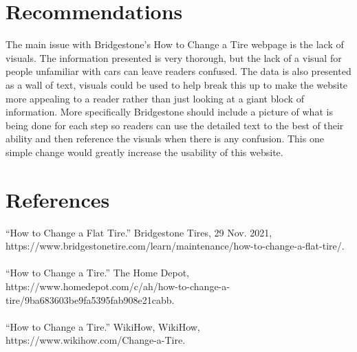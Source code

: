 \documentclass[12pt,A4paper]{article}
\begin{document}
	\section{Recommendations}
	The main issue with Bridgestone’s How to Change a Tire webpage is the lack of visuals. The information presented is very thorough, but the lack of a visual for people unfamiliar with cars can leave readers confused. The data is also presented as a wall of text, visuals could be used to help break this up to make the website more appealing to a reader rather than just looking at a giant block of information. More specifically Bridgestone should include a picture of what is being done for each step so readers can use the detailed text to the best of their ability and then reference the visuals when there is any confusion. This one simple change would greatly increase the usability of this website. 

	\section{References}
	“How to Change a Flat Tire.” Bridgestone Tires, 29 Nov. 2021, https://www.bridgestonetire.com/learn/maintenance/how-to-change-a-flat-tire/.\\ \\
	“How to Change a Tire.” The Home Depot, https://www.homedepot.com/c/ah/how-to-change-a-tire/9ba683603be9fa5395fab908e21cabb.\\ \\
	“How to Change a Tire.” WikiHow, WikiHow, https://www.wikihow.com/Change-a-Tire.\\
\end{document}
